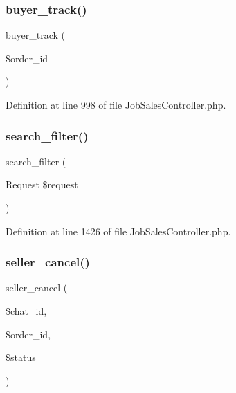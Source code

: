 \mbox{\label{class_responsive_1_1_http_1_1_controllers_1_1_job_sales_controller_a0c07b1ea236beecb7f99bc6b37eeb6f5}} 
\subsubsection{\texorpdfstring{buyer\_track()}{buyer\_track()}}
{\footnotesize\ttfamily buyer\+\_\+track (\begin{DoxyParamCaption}\item[{}]{\$order\+\_\+id }\end{DoxyParamCaption})}



Definition at line 998 of file Job\+Sales\+Controller.\+php.

\mbox{\label{class_responsive_1_1_http_1_1_controllers_1_1_job_sales_controller_a3943fd5c1dc7b10adc4f2b77b67b5860}} 
\subsubsection{\texorpdfstring{search\_filter()}{search\_filter()}}
{\footnotesize\ttfamily search\+\_\+filter (\begin{DoxyParamCaption}\item[{Request}]{\$request }\end{DoxyParamCaption})}



Definition at line 1426 of file Job\+Sales\+Controller.\+php.

\mbox{\label{class_responsive_1_1_http_1_1_controllers_1_1_job_sales_controller_a54c733ab6d5dfcff2ae4c96bd2cba854}} 
\subsubsection{\texorpdfstring{seller\_cancel()}{seller\_cancel()}}
{\footnotesize\ttfamily seller\+\_\+cancel (\begin{DoxyParamCaption}\item[{}]{\$chat\+\_\+id,  }\item[{}]{\$order\+\_\+id,  }\item[{}]{\$status }\end{DoxyParamCaption})}



